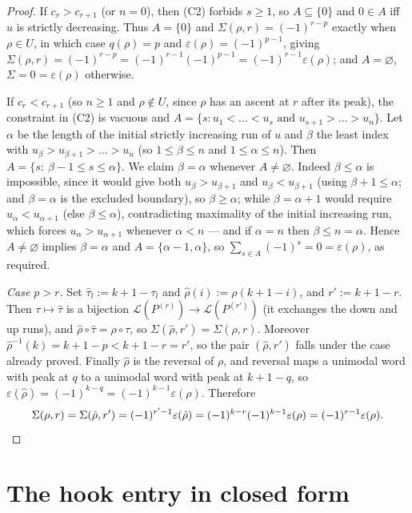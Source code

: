 \documentclass[11pt]{article}
\theoremstyle{definition}
\begin{document}
\begin{proof}
If $c_r>c_{r+1}$ (or $n=0$), then (C2) forbids $s\ge1$, so $A\subseteq\{0\}$ and $0\in A$ iff
$u$ is strictly decreasing.  Thus $A=\{0\}$ and $\Sigma(\rho,r)=(-1)^{r-p}$ exactly when
$\rho\in U$, in which case $q(\rho)=p$ and $\varepsilon(\rho)=(-1)^{p-1}$, giving
$\Sigma(\rho,r)=(-1)^{r-p}=(-1)^{r-1}(-1)^{p-1}=(-1)^{r-1}\varepsilon(\rho)$; and $A=\varnothing$,
$\Sigma=0=\varepsilon(\rho)$ otherwise.

If $c_r<c_{r+1}$ (so $n\ge1$ and $\rho\notin U$, since $\rho$ has an ascent at $r$ after its
peak), the constraint in (C2) is vacuous and $A=\{s: u_1<\dots<u_s\text{ and }u_{s+1}>\dots>u_n\}$.
Let $\alpha$ be the length of the initial strictly increasing run of $u$ and $\beta$ the least
index with $u_\beta>u_{\beta+1}>\dots>u_n$ (so $1\le\beta\le n$ and $1\le\alpha\le n$).  Then
$A=\{s:\ \beta-1\le s\le\alpha\}$.  We claim $\beta=\alpha$ whenever $A\ne\varnothing$.
Indeed $\beta\le\alpha$ is impossible, since it would give both $u_\beta>u_{\beta+1}$ and
$u_\beta<u_{\beta+1}$ (using $\beta+1\le\alpha$; and $\beta=\alpha$ is the excluded boundary),
so $\beta\ge\alpha$; while $\beta=\alpha+1$ would require $u_\alpha<u_{\alpha+1}$ (else
$\beta\le\alpha$), contradicting maximality of the initial increasing run, which forces
$u_\alpha>u_{\alpha+1}$ whenever $\alpha<n$ --- and if $\alpha=n$ then $\beta\le n=\alpha$.
Hence $A\ne\varnothing$ implies $\beta=\alpha$ and $A=\{\alpha-1,\alpha\}$, so
$\sum_{s\in A}(-1)^s=0=\varepsilon(\rho)$, as required.

\smallskip
\emph{Case $p>r$.}  Set $\hat\tau_l:=k+1-\tau_l$ and $\hat\rho(i):=\rho(k+1-i)$, and
$r':=k+1-r$.  Then $\tau\mapsto\hat\tau$ is a bijection
$\mathcal L(P^{(r)})\to\mathcal L(P^{(r')})$ (it exchanges the down and up runs), and
$\hat\rho\circ\hat\tau=\rho\circ\tau$, so $\Sigma(\hat\rho,r')=\Sigma(\rho,r)$.  Moreover
$\hat\rho^{-1}(k)=k+1-p<k+1-r=r'$, so the pair $(\hat\rho,r')$ falls under the case already
proved.  Finally $\hat\rho$ is the reversal of $\rho$, and reversal maps a unimodal word with
peak at $q$ to a unimodal word with peak at $k+1-q$, so
$\varepsilon(\hat\rho)=(-1)^{k-q}=(-1)^{k-1}\varepsilon(\rho)$.  Therefore
\[
  \Sigma(\rho,r)=\Sigma(\hat\rho,r')=(-1)^{r'-1}\varepsilon(\hat\rho)
  =(-1)^{k-r}(-1)^{k-1}\varepsilon(\rho)=(-1)^{r-1}\varepsilon(\rho). \qedhere
\]
\end{proof}

\section{The hook entry in closed form}
\end{document}
